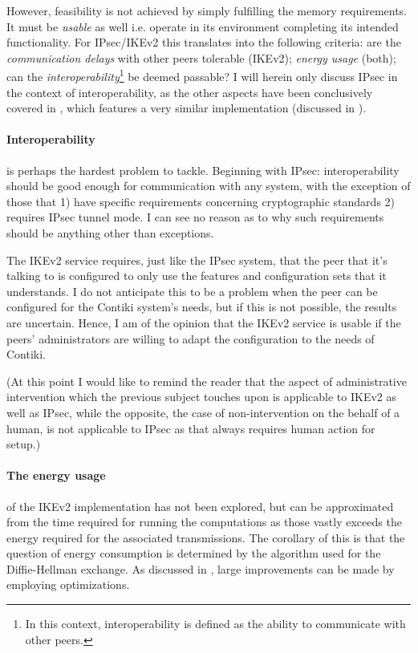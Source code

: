 \documentclass[final,a4paper,twoside,11pt,onecolumn]{report}
\begin{document}
However, feasibility is not achieved by simply fulfilling the memory requirements. It must be \emph{usable} as well i.e. operate in its environment completing its intended functionality. For IPsec/IKEv2 this translates into the following criteria: are the \emph{communication delays} with other peers tolerable (IKEv2); \emph{energy usage} (both); can the \emph{interoperability}\footnote{In this context, interoperability is defined as the ability to communicate with other peers.} be deemed passable? I will herein only discuss IPsec in the context of interoperability, as the other aspects have been conclusively covered in \cite{raza11securing}, which features a very similar implementation (discussed in ).

\paragraph{Interoperability} is perhaps the hardest problem to tackle. Beginning with IPsec: interoperability should be good enough for communication with any system, with the exception of those that 1) have specific requirements concerning cryptographic standards 2) requires IPsec tunnel mode. I can see no reason as to why such requirements should be anything other than exceptions.

The IKEv2 service requires, just like the IPsec system, that the peer that it's talking to is configured to only use the features and configuration sets that it understands. I do not anticipate this to be a problem when the peer can be configured for the Contiki system's needs, but if this is not possible, the results are uncertain. Hence, I am of the opinion that the IKEv2 service is usable if the peers' administrators are willing to adapt the configuration to the needs of Contiki.

(At this point I would like to remind the reader that the aspect of administrative intervention which the previous subject touches upon is applicable to IKEv2 as well as IPsec, while the opposite, the case of non-intervention on the behalf of a human, is not applicable to IPsec as that always requires human action for setup.)



\paragraph{The energy usage} of the IKEv2 implementation has not been explored, but can be approximated from the time required for running the computations as those vastly exceeds the energy required for the associated transmissions. The corollary of this is that the question of energy consumption is determined by the algorithm used for the Diffie-Hellman exchange. As discussed in , large improvements can be made by employing optimizations.
\end{document}
